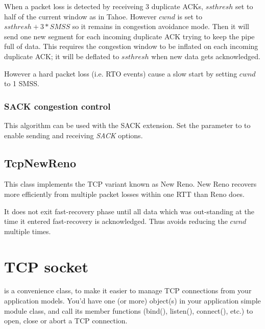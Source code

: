 When a packet loss is detected by receiveing 3 duplicate ACKs,
$ssthresh$ set to half of the current window as in Tahoe. However
$cwnd$ is set to $ssthresh + 3*SMSS$ so it remains in congestion
avoidance mode. Then it will send one new segment for each incoming
duplicate ACK trying to keep the pipe full of data. This requires
the congestion window to be inflated on each incoming duplicate
ACK; it will be deflated to $ssthresh$ when new data gets
acknowledged.

However a hard packet loss (i.e. RTO events) cause a
slow start by setting $cwnd$ to 1 SMSS.

\subsubsection*{SACK congestion control}

This algorithm can be used with the SACK extension.
Set the  parameter to  to
enable sending and receiving \emph{SACK} options.

\subsection{TcpNewReno}

This class implements the TCP variant known as New Reno.
New Reno recovers more efficiently from multiple packet losses within one RTT
than Reno does.

It does not exit fast-recovery phase until all data which was out-standing
at the time it entered fast-recovery is acknowledged. Thus avoids
reducing the $cwnd$ multiple times.

\section{TCP socket}


 is a convenience class, to make it easier to manage TCP connections
from your application models. You'd have one (or more)  object(s)
in your application simple module class, and call its member functions
(bind(), listen(), connect(), etc.) to open, close or abort a TCP connection.


